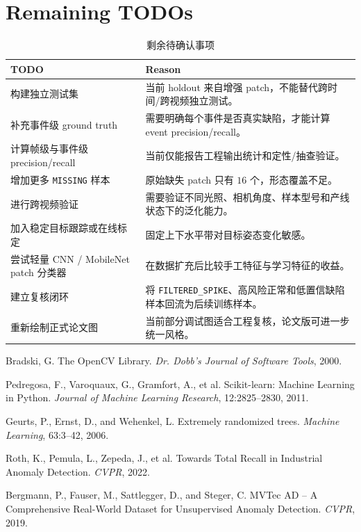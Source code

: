 \documentclass[a4paper,12pt]{article}
\newcommand{\code}[1]{\texttt{#1}}
\begin{document}
\section{Remaining TODOs}
\begin{table}[H]
\centering
\caption{剩余待确认事项}
\label{tab:todos}
\small
\begin{tabularx}{\textwidth}{L{0.34\textwidth}Y}
\toprule
TODO & Reason \\
\midrule
构建独立测试集 & 当前 holdout 来自增强 patch，不能替代跨时间/跨视频独立测试。 \\
补充事件级 ground truth & 需要明确每个事件是否真实缺陷，才能计算 event precision/recall。 \\
计算帧级与事件级 precision/recall & 当前仅能报告工程输出统计和定性/抽查验证。 \\
增加更多 \code{MISSING} 样本 & 原始缺失 patch 只有 $16$ 个，形态覆盖不足。 \\
进行跨视频验证 & 需要验证不同光照、相机角度、样本型号和产线状态下的泛化能力。 \\
加入稳定目标跟踪或在线标定 & 固定上下水平带对目标姿态变化敏感。 \\
尝试轻量 CNN / MobileNet patch 分类器 & 在数据扩充后比较手工特征与学习特征的收益。 \\
建立复核闭环 & 将 \code{FILTERED\_SPIKE}、高风险正常和低置信缺陷样本回流为后续训练样本。 \\
重新绘制正式论文图 & 当前部分调试图适合工程复核，论文版可进一步统一风格。 \\
\bottomrule
\end{tabularx}
\end{table}

\begin{thebibliography}{99}
Bradski, G. The OpenCV Library. \emph{Dr. Dobb's Journal of Software Tools}, 2000.

Pedregosa, F., Varoquaux, G., Gramfort, A., et al. Scikit-learn: Machine Learning in Python. \emph{Journal of Machine Learning Research}, 12:2825--2830, 2011.

Geurts, P., Ernst, D., and Wehenkel, L. Extremely randomized trees. \emph{Machine Learning}, 63:3--42, 2006.

Roth, K., Pemula, L., Zepeda, J., et al. Towards Total Recall in Industrial Anomaly Detection. \emph{CVPR}, 2022.

Bergmann, P., Fauser, M., Sattlegger, D., and Steger, C. MVTec AD -- A Comprehensive Real-World Dataset for Unsupervised Anomaly Detection. \emph{CVPR}, 2019.
\end{thebibliography}
\end{document}
